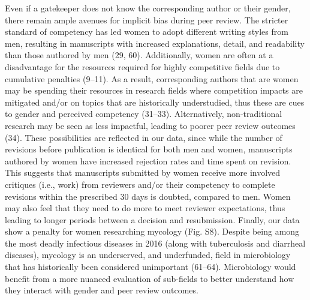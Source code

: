 \documentclass[11pt,]{article}
\begin{document}
Even if a gatekeeper does not know the corresponding author or their
gender, there remain ample avenues for implicit bias during peer review.
The stricter standard of competency has led women to adopt different
writing styles from men, resulting in manuscripts with increased
explanations, detail, and readability than those authored by men (29,
60). Additionally, women are often at a disadvantage for the resources
required for highly competitive fields due to cumulative penalties
(9--11). As a result, corresponding authors that are women may be
spending their resources in research fields where competition impacts
are mitigated and/or on topics that are historically understudied, thus
these are cues to gender and perceived competency (31--33).
Alternatively, non-traditional research may be seen as less impactful,
leading to poorer peer review outcomes (34). These possibilities are
reflected in our data, since while the number of revisions before
publication is identical for both men and women, manuscripts authored by
women have increased rejection rates and time spent on revision. This
suggests that manuscripts submitted by women receive more involved
critiques (i.e., work) from reviewers and/or their competency to
complete revisions within the prescribed 30 days is doubted, compared to
men. Women may also feel that they need to do more to meet reviewer
expectations, thus leading to longer periods between a decision and
resubmission. Finally, our data show a penalty for women researching
mycology (Fig. S8). Despite being among the most deadly infectious
diseases in 2016 (along with tuberculosis and diarrheal diseases),
mycology is an underserved, and underfunded, field in microbiology that
has historically been considered unimportant (61--64). Microbiology
would benefit from a more nuanced evaluation of sub-fields to better
understand how they interact with gender and peer review outcomes.
\end{document}
